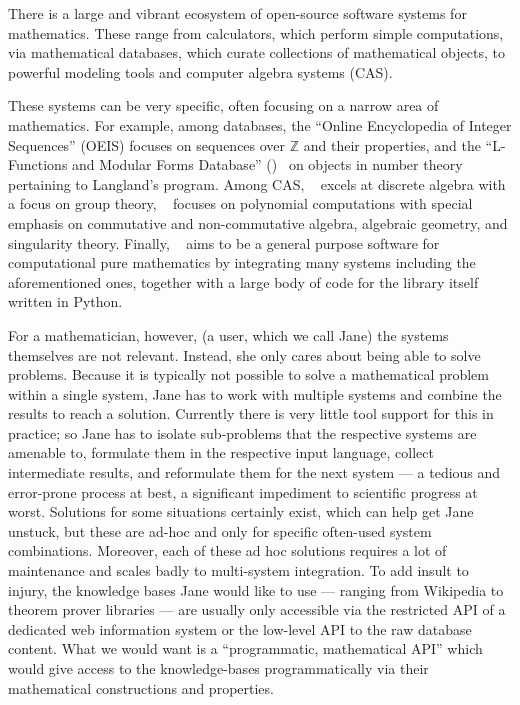 There is a large and vibrant ecosystem of open-source software systems for mathematics. 
These range from calculators, which perform simple computations, via mathematical databases, which curate collections of mathematical objects, to powerful modeling tools and computer algebra systems (CAS).

These systems can be very specific, often focusing on a narrow area of mathematics.
For example, among databases, the ``Online Encyclopedia of Integer Sequences'' (OEIS) focuses on sequences over $\mathbb{Z}$ and their properties, and the ``L-Functions and Modular Forms Database'' (\LMFDB)~\cite{Cremona:LMFDB16,lmfdb:on} on objects in number theory pertaining to Langland's program.
Among CAS, \GAP~\cite{GAP:on} excels at discrete algebra with a focus on group theory, \Singular~\cite{singular:on} focuses on polynomial computations with special emphasis on commutative and non-commutative algebra, algebraic geometry, and singularity theory.
Finally, \Sage~\cite{SageMath:on} aims to be a general purpose software for computational pure mathematics by integrating many systems including the aforementioned ones, together with a large body of code for the {\Sage} library itself written in Python.

For a mathematician, however, (a user, which we call Jane) the systems themselves are not relevant.
Instead, she only cares about being able to solve problems. 
Because it is typically not possible to solve a mathematical problem within a single system, Jane has to work with multiple systems and combine the results to reach a solution. 
Currently there is very little tool support for this in practice; so Jane has to isolate sub-problems that the respective systems are amenable to, formulate them in the respective input language, collect intermediate results, and reformulate them for the next system --- a tedious and error-prone process at best, a significant impediment to scientific progress at worst.
Solutions for some situations certainly exist, which can help get Jane unstuck, but these are ad-hoc and only for specific often-used system combinations. 
Moreover, each of these ad hoc solutions requires a lot of maintenance and scales badly to
multi-system integration.
To add insult to injury, the knowledge bases Jane would like to use --- ranging from Wikipedia to theorem prover libraries --- are usually only accessible via the restricted API of a dedicated web information system or the low-level API to the raw database content.  
What we would want is a ``programmatic, mathematical API'' which would give access to the knowledge-bases programmatically via their mathematical constructions and properties.

